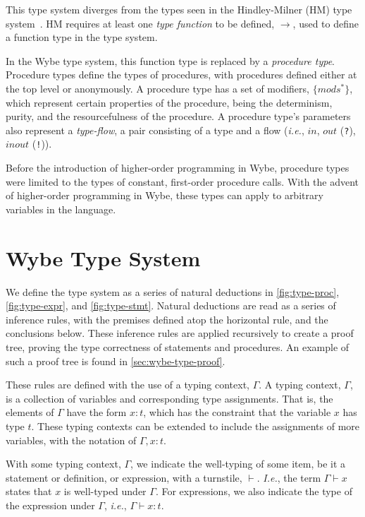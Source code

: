 This type system diverges from the types seen in the Hindley-Milner (HM) type system~\cite{hindley1969principal,damas1984type,milner1978theory}. HM requires at least one \textit{type function} to be defined, $\to$, used to define a function type in the type system. 

In the Wybe type system, this function type is replaced by a \textit{procedure type}. Procedure types define the types of procedures, with procedures defined either at the top level or anonymously. A procedure type has a set of modifiers, $\mathtt{\{}mods^{*}\mathtt{\}}$, which represent certain properties of the procedure, being the determinism, purity, and the resourcefulness of the procedure. A procedure type's parameters also represent a \textit{type-flow}, a pair consisting of a type and a flow (\textit{i.e.}, $in$, $out$ (\texttt{?}), $inout$ (\texttt{!})).

Before the introduction of higher-order programming in Wybe, procedure types were limited to the types of constant, first-order procedure calls. With the advent of higher-order programming in Wybe, these types can apply to arbitrary variables in the language.

\section{Wybe Type System}
\label{sec:wybe-type-system}

We define the type system as a series of natural deductions in \cref{fig:type-proc}, \cref{fig:type-expr}, and \cref{fig:type-stmt}. Natural deductions are read as a series of inference rules, with the premises defined atop the horizontal rule, and the conclusions below. These inference rules are applied recursively to create a proof tree, proving the type correctness of statements and procedures. An example of such a proof tree is found in \cref{sec:wybe-type-proof}.

These rules are defined with the use of a typing context, $\Gamma$. A typing context, $\Gamma$, is a collection of variables and corresponding type assignments. That is, the elements of $\Gamma$ have the form $x:t$, which has the constraint that the variable $x$ has type $t$. These typing contexts can be extended to include the assignments of more variables, with the notation of $\Gamma, x:t$. 

With some typing context, $\Gamma$, we indicate the well-typing of some item, be it a statement or definition, or expression, with a turnstile, $\vdash$. \textit{I.e.}, the term $\Gamma \vdash x$ states that $x$ is well-typed under $\Gamma$. For expressions, we also indicate the type of the expression under $\Gamma$, \textit{i.e.}, $\Gamma \vdash x:t$.

